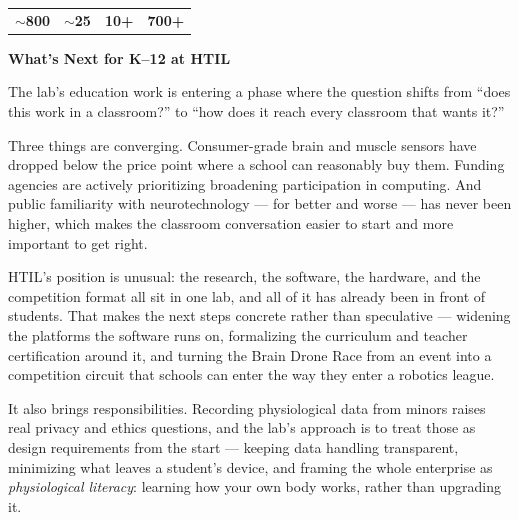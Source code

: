 \documentclass[10pt,letterpaper]{article}
\makeatletter
\newcommand{\eyebrow}[1]{{\sffamily\bfseries\color{htilred}\fontsize{7.4}{9}\selectfont\textls[150]{\MakeUppercase{#1}}}\par\vspace{1.5pt}}
\newcommand{\hairline}{\noindent{\color{htilrule}\rule{\linewidth}{0.4pt}}\par}
\newcommand{\headsm}[1]{{\fontsize{17.5}{19}\selectfont\bfseries #1}\par\vspace{3pt}}
\newcommand{\standfirst}[1]{{\fontsize{12}{15}\selectfont #1}\par\vspace{5pt}}
\newcommand{\statcell}[2]{{\color{htilred}\fontsize{18.5}{19}\selectfont\bfseries #1}\par\vspace{1pt}{\color{htilgray}\fontsize{7.2}{8.7}\selectfont #2}}
\newcommand{\statband}[8]{%
  \par\vspace{4pt}%
  \noindent{\color{htilink}\rule{\linewidth}{1.4pt}}\par\vspace{3pt}%
  \noindent\begin{tabularx}{\linewidth}{@{}X|X|X|X@{}}
    \statcell{#1}{#2} & \statcell{#3}{#4} & \statcell{#5}{#6} & \statcell{#7}{#8} \\
  \end{tabularx}\par\vspace{2pt}%
  \noindent{\color{htilrule}\rule{\linewidth}{0.4pt}}\par\vspace{2pt}}
\makeatother
\begin{document}
\statband
  {$\sim$800}{K--12 students reached through camps and classroom programs over roughly a decade}%
  {$\sim$25}{Pre- and in-service teachers trained in sensing technologies through the lab's PD programs}%
  {10+}{Years of classroom research behind the current tools and curriculum}%
  {700+}{Public schools across Alabama --- the reach a statewide rollout would put within range}

\clearpage
\eyebrow{Impact \& Next}
\headsm{What's Next for K--12 at HTIL}
\standfirst{The lab's education work is entering a phase where the question shifts from ``does this work in a classroom?'' to ``how does it reach every classroom that wants it?''}
\hairline
\vspace{4pt}

\noindent
\begin{minipage}[t]{0.615\linewidth}
  \begin{multicols}{2}
  Three things are converging. Consumer-grade brain and muscle sensors have dropped below the price point where a school can reasonably buy them. Funding agencies are actively prioritizing broadening participation in computing. And public familiarity with neurotechnology --- for better and worse --- has never been higher, which makes the classroom conversation easier to start and more important to get right.

  HTIL's position is unusual: the research, the software, the hardware, and the competition format all sit in one lab, and all of it has already been in front of students. That makes the next steps concrete rather than speculative --- widening the platforms the software runs on, formalizing the curriculum and teacher certification around it, and turning the Brain Drone Race from an event into a competition circuit that schools can enter the way they enter a robotics league.

  It also brings responsibilities. Recording physiological data from minors raises real privacy and ethics questions, and the lab's approach is to treat those as design requirements from the start --- keeping data handling transparent, minimizing what leaves a student's device, and framing the whole enterprise as \emph{physiological literacy}: learning how your own body works, rather than upgrading it.
  \end{multicols}
\end{minipage}%
\hfill
\end{document}
